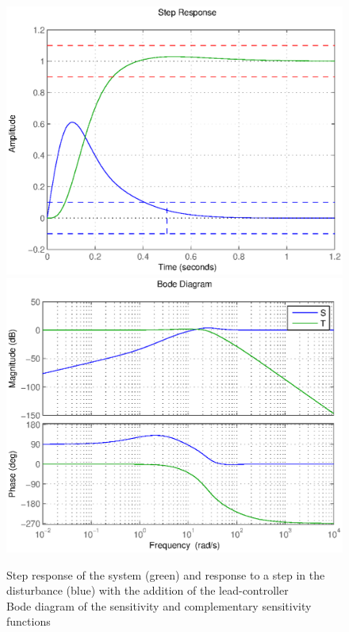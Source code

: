 \begin{figure}[h!t]
    \includegraphics[width=\columnwidth]{fig/designFr.eps}
    \includegraphics[width=\columnwidth]{fig/sensitivitiesFunction.eps}
    \caption{Step response of the system (green) and response to a step in the disturbance (blue) with the addition of the lead-controller \\ Bode diagram of the sensitivity and complementary sensitivity functions}
    \label{designFr}
\end{figure}

